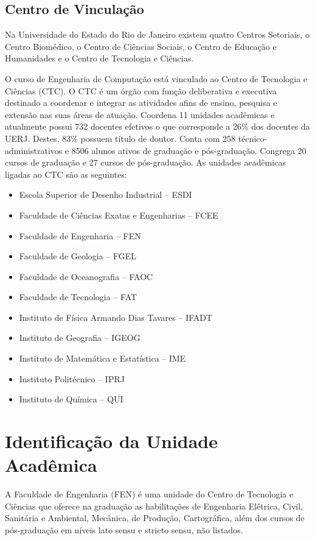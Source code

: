 \subsection{Centro de Vinculação}

Na Universidade do Estado do Rio de Janeiro existem quatro Centros Setoriais, o Centro Biomédico, o Centro de Ciências Sociais, o Centro de Educação e Humanidades e o Centro de Tecnologia e Ciências.

O curso de Engenharia de Computação está vinculado ao Centro de Tecnologia e Ciências (CTC).
O CTC é um órgão com função deliberativa e executiva destinado a coordenar e integrar as atividades afins de ensino, pesquisa e extensão nas suas áreas de atuação. Coordena 11 unidades acadêmicas e atualmente possui 732 docentes efetivos o que corresponde a 26\% dos docentes da UERJ. Destes, 83\% possuem título de doutor. Conta com 258 técnico-administrativos e 8506 alunos ativos de graduação e pós-graduação. Congrega 20 cursos de graduação e 27 cursos de pós-graduação. As unidades acadêmicas ligadas ao CTC são as seguintes:

\begin{itemize}

\item Escola Superior de Desenho Industrial – ESDI
\item Faculdade de Ciências Exatas e Engenharias – FCEE
\item Faculdade de Engenharia – FEN
\item Faculdade de Geologia – FGEL
\item Faculdade de Oceanografia – FAOC
\item Faculdade de Tecnologia – FAT
\item Instituto de Física Armando Dias Tavares – IFADT
\item Instituto de Geografia – IGEOG
\item Instituto de Matemática e Estatística – IME
\item Instituto Politécnico – IPRJ
\item Instituto de Química – QUI

\end{itemize}

\section{Identificação da Unidade Acadêmica}

A Faculdade de Engenharia (FEN) é uma unidade do Centro de Tecnologia e Ciências que oferece na graduação as habilitações de Engenharia Elétrica, Civil, Sanitária e Ambiental, Mecânica, de Produção, Cartográfica, além dos cursos de pós-graduação em níveis lato sensu e stricto sensu, não listados.

